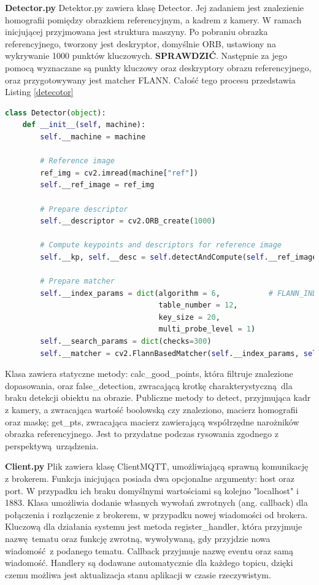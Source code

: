 \documentclass[12pt,twoside,polish]{article}
\begin{document}
\textbf{Detector.py}
Detektor.py zawiera klasę Detector. Jej zadaniem jest znalezienie homografii pomiędzy obrazkiem referencyjnym, a kadrem z kamery. W ramach inicjującej przyjmowana jest struktura maszyny. Po pobraniu obrazka referencyjnego, tworzony jest deskryptor, domyślnie ORB, ustawiony na wykrywanie 1000 punktów kluczowych. \textbf{SPRAWDZIĆ}. Następnie za jego pomocą wyznaczane są punkty kluczowy oraz deskryptory obrazu referencyjnego, oraz przygotowywany jest matcher FLANN. Całość tego procesu przedstawia Listing \ref{detecotor}

\begin{lstlisting}[language=Python,label=machine,caption=Stworzenie instancji Detector]
class Detector(object):
	def __init__(self, machine):
		self.__machine = machine

		# Reference image
		ref_img = cv2.imread(machine["ref"])
		self.__ref_image = ref_img
		
		# Prepare descriptor
		self.__descriptor = cv2.ORB_create(1000)
		
		# Compute keypoints and descriptors for reference image
		self.__kp, self.__desc = self.detectAndCompute(self.__ref_image)

		# Prepare matcher
		self.__index_params = dict(algorithm = 6,           # FLANN_INDEX_LSH
							       table_number = 12,
								   key_size = 20,
								   multi_probe_level = 1)
		self.__search_params = dict(checks=300)
		self.__matcher = cv2.FlannBasedMatcher(self.__index_params, self.__search_params)
\end{lstlisting}

Klasa zawiera statyczne metody: calc\_good\_points, która filtruje znalezione dopasowania, oraz false\_detection, zwracającą krotkę charakterystyczną dla braku detekcji obiektu na obrazie. Publiczne metody to detect, przyjmująca kadr z kamery, a zwracająca wartość boolowską czy znaleziono, macierz homografii oraz maskę; get\_pts, zwracająca macierz zawierającą współrzędne narożników obrazka referencyjnego. Jest to przydatne podczas rysowania zgodnego z perspektywą urządzenia.

\textbf{Client.py}
Plik zawiera klasę ClientMQTT, umożliwiającą sprawną komunikację z brokerem. Funkcja inicjująca posiada dwa opcjonalne argumenty: host oraz port. W przypadku ich braku domyślnymi wartościami są kolejno "localhost" i 1883. Klasa umożliwia dodanie własnych wywołań zwrotnych (ang. callback) dla połączenia i rozłączenie z brokerem, w przypadku nowej wiadomości od brokera. Kluczową dla działania systemu jest metoda register\_handler, która przyjmuje nazwę tematu oraz funkcję zwrotną, wywoływaną, gdy przyjdzie nowa wiadomość z podanego tematu. Callback przyjmuje nazwę eventu oraz samą wiadomość. Handlery są dodawane automatycznie dla każdego topicu, dzięki czemu możliwa jest aktualizacja stanu aplikacji w czasie rzeczywistym.
\end{document}
